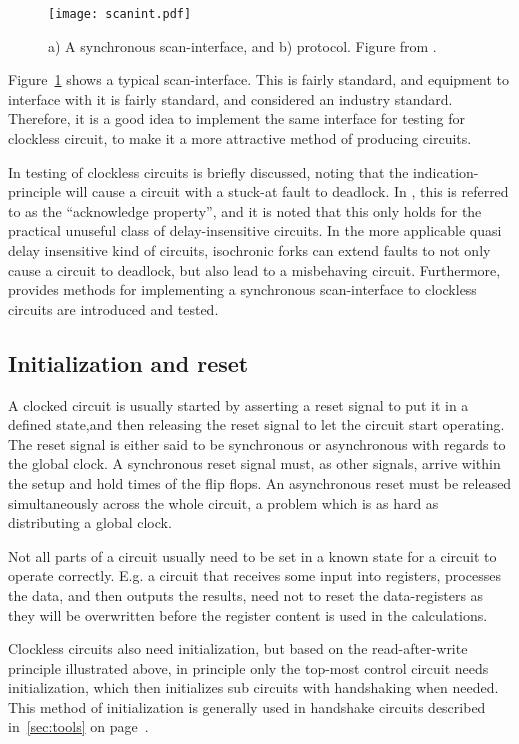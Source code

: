 \begin{figure}[htbp]
  \centering
  \texttt{[image: scanint.pdf]}
  \caption{a) A synchronous scan-interface, and b) protocol. Figure
    from \cite[pp. 11]{fullscan}.}
  \label{fig:scanint}
\end{figure}

Figure~\ref{fig:scanint} shows a typical scan-interface. This is
fairly standard, and equipment to interface with it is fairly
standard, and considered an industry standard. Therefore, it is
a good idea to implement the same interface for testing for clockless
circuit, to make it a more attractive method of producing circuits.

In \cite[pp. 27-28]{sparso} testing of clockless circuits is briefly
discussed, noting that the indication-principle will cause a circuit
with a stuck-at fault to deadlock. In \cite[pp. 26]{fullscan}, this is
referred to as the ``acknowledge property'', and it is noted that this
only holds for the practical unuseful class of delay-insensitive
circuits. In the more applicable quasi delay insensitive kind of
circuits, isochronic forks can extend faults to not only cause a
circuit to deadlock, but also lead to a misbehaving circuit.
Furthermore, \cite{fullscan} provides methods for implementing a
synchronous scan-interface to clockless circuits are introduced and
tested.

\subsection{Initialization and reset}

A clocked circuit is usually started by asserting a reset signal to
put it in a defined state,and then releasing the reset signal to let
the circuit start operating. The reset signal is either said to be
synchronous or asynchronous with regards to the global clock. A
synchronous reset signal must, as other signals, arrive within the
setup and hold times of the flip flops. An asynchronous reset must be
released simultaneously across the whole circuit, a problem which is
as hard as distributing a global clock.

Not all parts of a circuit usually need to be set in a known state
for a circuit to operate correctly. E.g. a circuit that receives some
input into registers, processes the data, and then outputs the
results, need not to reset the data-registers as they will be
overwritten before the register content is used in the calculations.

Clockless circuits also need initialization, but based on the
read-after-write principle illustrated above, in principle only the
top-most control circuit needs initialization, which then initializes
sub circuits with handshaking when needed. This method of
initialization is generally used in handshake circuits described
in~\ref{sec:tools} on page~\pageref{par:init}.

